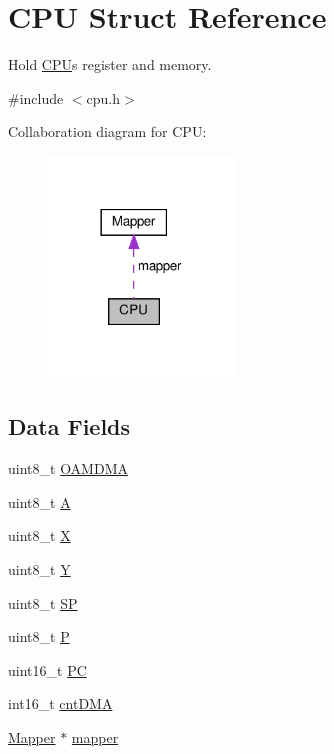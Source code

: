 \hypertarget{struct_c_p_u}{}\section{C\+PU Struct Reference}
\label{struct_c_p_u}


Hold \hyperlink{struct_c_p_u}{C\+PU}\textquotesingle{}s register and memory.  




{\ttfamily \#include $<$cpu.\+h$>$}



Collaboration diagram for C\+PU\+:\nopagebreak
\begin{figure}[H]
\begin{center}
\leavevmode
\includegraphics[width=141pt]{struct_c_p_u__coll__graph}
\end{center}
\end{figure}
\subsection*{Data Fields}
\begin{DoxyCompactItemize}
\item 
uint8\+\_\+t \hyperlink{struct_c_p_u_a82fee18d426d3096d23e36cf11ee1995}{O\+A\+M\+D\+MA}
\item 
uint8\+\_\+t \hyperlink{struct_c_p_u_aa99de428bd3e7715b73b335a5af9e900}{A}
\item 
uint8\+\_\+t \hyperlink{struct_c_p_u_aab1bda195b91ffec73b84bc55e9dccf1}{X}
\item 
uint8\+\_\+t \hyperlink{struct_c_p_u_a76ad371f34c724bc71c518bd836a2e2b}{Y}
\item 
uint8\+\_\+t \hyperlink{struct_c_p_u_a11a50c8ce97cdc9e1588fa7201e388f3}{SP}
\item 
uint8\+\_\+t \hyperlink{struct_c_p_u_a2ad95e9194a5bfaa373bbd26ea925209}{P}
\item 
uint16\+\_\+t \hyperlink{struct_c_p_u_afa06037aaac5044b97dde7b9f8771ce6}{PC}
\item 
int16\+\_\+t \hyperlink{struct_c_p_u_a5e42ea87358490e9b0240807c963a734}{cnt\+D\+MA}
\item 
\hyperlink{struct_mapper}{Mapper} $\ast$ \hyperlink{struct_c_p_u_a2a9230344a369ccd1d395edd03dd6827}{mapper}
\end{DoxyCompactItemize}


